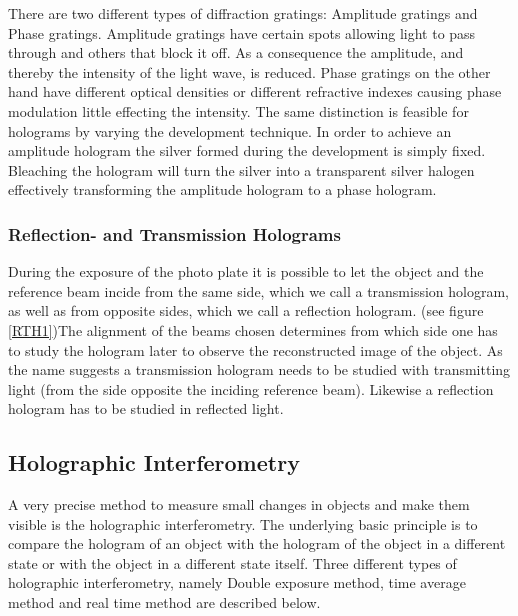 There are two different types of diffraction gratings: Amplitude gratings and Phase gratings. Amplitude gratings have certain spots allowing light to pass through and others that block it off. As a consequence the amplitude, and thereby the intensity of the light wave, is reduced. Phase gratings on the other hand have different optical densities or different refractive indexes causing phase modulation little effecting the intensity.
The same distinction is feasible for holograms by varying the development technique. In order to achieve an amplitude hologram the silver formed during the development is simply fixed. Bleaching the hologram will turn the silver into a transparent silver halogen effectively transforming the amplitude hologram to a phase hologram. 

\subsubsection{Reflection- and Transmission Holograms}

During the exposure of the photo plate it is possible to let the object and the reference beam incide from the same side, which we call a transmission hologram, as well as from opposite sides, which we call a reflection hologram. (see figure \ref{RTH1})The alignment of the beams chosen determines from which side one has to study the hologram later to observe the reconstructed image of the object.
As the name suggests a transmission hologram needs to be studied with transmitting light (from the side opposite the inciding reference beam). Likewise a reflection hologram has to be studied in reflected light.



\subsection{Holographic Interferometry}

A very precise method to measure small changes in objects and make them visible is the holographic interferometry. The underlying basic principle is to compare the hologram of an object with the hologram of the object in a different state or with the object in a different state itself. Three different types of holographic interferometry, namely Double exposure method, time average method and real time method are described below.

